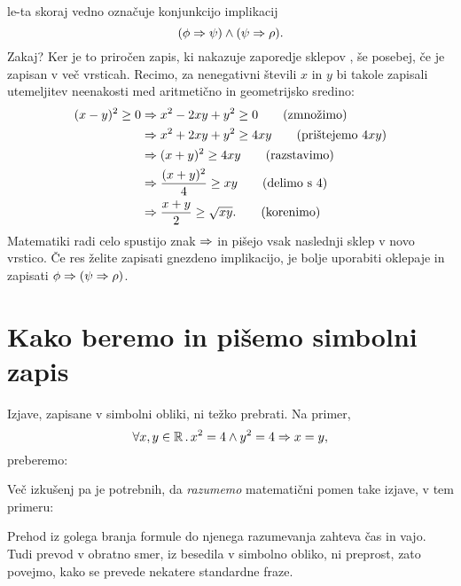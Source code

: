 %
le-ta skoraj vedno označuje konjunkcijo implikacij
%
\begin{equation*}
  (\phi \Rightarrow \psi) \land (\psi \Rightarrow \rho).
\end{equation*}
%
Zakaj? Ker je to priročen zapis, ki nakazuje zaporedje sklepov
, še posebej,
če je zapisan v več vrsticah. Recimo, za nenegativni števili $x$ in
$y$ bi takole zapisali utemeljitev neenakosti med aritmetično in
geometrijsko sredino:
%
\begin{align*}
  (x - y)^2 \geq 0
  &\Rightarrow x^2 - 2 x y + y^2 \geq 0
  \tag{zmnožimo}\\
  &\Rightarrow x^2 + 2 x y + y^2 \geq 4 x y
  \tag{prištejemo $4 x y$}\\
  &\Rightarrow (x + y)^2 \geq 4 x y
  \tag{razstavimo}\\
  &\Rightarrow \frac{(x + y)^2}{4} \geq x y
  \tag{delimo s $4$}\\
  &\Rightarrow \frac{x+y}{2} \geq \sqrt{x y}.
  \tag{korenimo}
\end{align*}
%
Matematiki radi celo spustijo znak $\Rightarrow$ in pišejo vsak naslednji sklep v novo vrstico.
%
Če res želite zapisati gnezdeno implikacijo, je bolje uporabiti oklepaje in zapisati $\phi \Rightarrow (\psi
\Rightarrow \rho)$.


\section{Kako beremo in pišemo simbolni zapis}
\label{sec:simbolni-zapis}

Izjave, zapisane v simbolni obliki, ni težko prebrati. Na primer,
%
\begin{equation*}
  \forall x, y \in \mathbb{R} \,.\,
    x^2 = 4 \land y^2 = 4 \Rightarrow x = y,
\end{equation*}
%
preberemo:
%
\begin{quote}
\end{quote}
%
Več izkušenj pa je potrebnih, da \emph{razumemo} matematični pomen
take izjave, v tem primeru:
%
\begin{quote}
\end{quote}
%
Prehod iz golega branja formule do njenega razumevanja zahteva čas in vajo.
Tudi prevod v obratno smer, iz besedila v simbolno obliko, ni preprost,
zato povejmo, kako se prevede nekatere standardne fraze.

